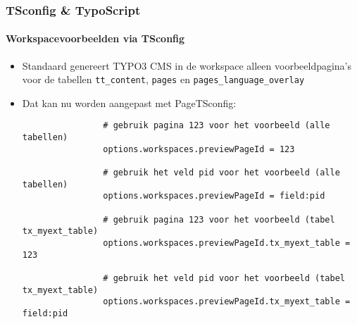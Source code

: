 \begin{frame}[fragile]
	\frametitle{TSconfig \& TypoScript}
	\framesubtitle{Workspacevoorbeelden via TSconfig}

	\lstset{basicstyle=\tiny\ttfamily}

	\begin{itemize}

		\item Standaard genereert TYPO3 CMS in de workspace alleen voorbeeldpagina's 
			voor de tabellen \texttt{tt\_content}, \texttt{pages} en \texttt{pages\_language\_overlay}

		\item Dat kan nu worden aangepast met PageTSconfig:

			\begin{lstlisting}
				# gebruik pagina 123 voor het voorbeeld (alle tabellen)
				options.workspaces.previewPageId = 123

				# gebruik het veld pid voor het voorbeeld (alle tabellen)
				options.workspaces.previewPageId = field:pid

				# gebruik pagina 123 voor het voorbeeld (tabel tx_myext_table)
				options.workspaces.previewPageId.tx_myext_table = 123

				# gebruik het veld pid voor het voorbeeld (tabel tx_myext_table)
				options.workspaces.previewPageId.tx_myext_table = field:pid
			\end{lstlisting}

	\end{itemize}

\end{frame}

